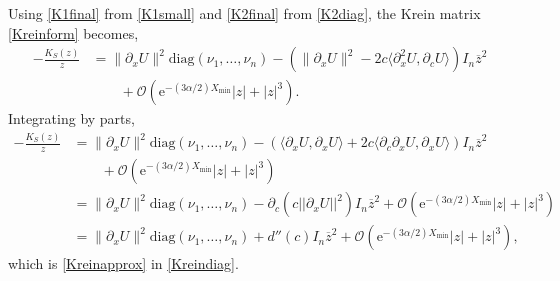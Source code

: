 \documentclass[review,onefignum,onetabnum]{siamart171218}
\newcommand{\rme}{\mathrm{e}}
\newcommand{\vI}{\bm{\mathit{I}}}
\newcommand{\vK}{\bm{\mathit{K}}}
\begin{document}
Using \cref{K1final} from \cref{K1small} and \cref{K2final} from \cref{K2diag}, the Krein matrix \cref{Kreinform} becomes,
\[%
\begin{aligned}
-\frac{\vK_S(z)}{z}&= \|\partial_xU\|^2 \text{diag}(\nu_1, \dots, \nu_n)
- ( \|\partial_xU\|^2 -2 c \langle \partial_x^2U, \partial_cU \rangle) \vI_n \overline{z}^2 \\
&\qquad + \mathcal{O}(\rme^{-(3 \alpha/2) X_{\mathrm{min}}}|z| + |z|^3).
\end{aligned}
\]%
Integrating by parts,
\[
\begin{aligned}
-\frac{\vK_S(z)}{z}
&= \|\partial_xU\|^2 \text{diag}(\nu_1, \dots, \nu_n) - \left( \langle \partial_xU, \partial_xU \rangle + 2c\langle \partial_c\partial_xU, \partial_xU\rangle \right)\vI_n\overline{z}^2\\
&\qquad + \mathcal{O}(\rme^{-(3 \alpha/2) X_{\mathrm{min}}}|z| + |z|^3)  \\
&= \|\partial_xU\|^2 \text{diag}(\nu_1, \dots, \nu_n) -\partial_c\left( c||\partial_xU||^2 \right) \vI_n \overline{z}^2  + \mathcal{O}(\rme^{-(3 \alpha/2) X_{\mathrm{min}}}|z| + |z|^3) \\
&= \|\partial_xU\|^2 \text{diag}(\nu_1, \dots, \nu_n) + d''(c) \vI_n \overline{z}^2  + \mathcal{O}(\rme^{-(3 \alpha/2) X_{\mathrm{min}}}|z| + |z|^3),
\end{aligned}
\]
which is \cref{Kreinapprox} in \cref{Kreindiag}.



%
%
%
\end{document}
